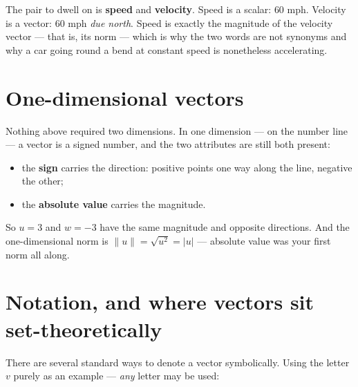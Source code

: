 \documentclass[11pt]{article}
\theoremstyle{definition}
\theoremstyle{remark}
\newcommand{\norm}[1]{\lVert #1\rVert}
\begin{document}
\noindent The pair to dwell on is \textbf{speed} and \textbf{velocity}. Speed is
a scalar: $60$ mph. Velocity is a vector: $60$ mph \emph{due north}. Speed is
exactly the magnitude of the velocity vector --- that is, its norm --- which is
why the two words are not synonyms and why a car going round a bend at constant
speed is nonetheless accelerating.

\section{One-dimensional vectors}
Nothing above required two dimensions. In one dimension --- on the number line
--- a vector is a signed number, and the two attributes are still both present:

\begin{itemize}[leftmargin=1.4em,itemsep=2pt]
  \item the \textbf{sign} carries the direction: positive points one way along
        the line, negative the other;
  \item the \textbf{absolute value} carries the magnitude.
\end{itemize}

\noindent So $u=3$ and $w=-3$ have the same magnitude and opposite directions.
And the one-dimensional norm is
$\norm{u}=\sqrt{u^{2}}=\lvert u\rvert$ --- absolute value was your first norm
all along.

\begin{center}
\end{center}

\section{Notation, and where vectors sit set-theoretically}
There are several standard ways to denote a vector symbolically. Using the
letter $v$ purely as an example --- \emph{any} letter may be used:
\end{document}

